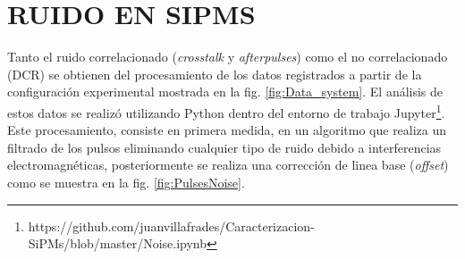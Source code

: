\section{RUIDO EN SIPMS}
Tanto el ruido correlacionado (\textit{crosstalk} y \textit{afterpulses}) como el no correlacionado (DCR) se obtienen del procesamiento de los datos registrados a partir de la configuración experimental mostrada en la fig. \ref{fig:Data_system}. El análisis de estos datos se realizó utilizando Python dentro del entorno de trabajo Jupyter\footnote{https://github.com/juanvillafrades/Caracterizacion-SiPMs/blob/master/Noise.ipynb}. Este procesamiento, consiste en primera medida, en un algoritmo que realiza un filtrado de los pulsos eliminando cualquier tipo de ruido debido a interferencias electromagnéticas, posteriormente se realiza una corrección de linea base (\textit{offset}) como se muestra en la fig. \ref{fig:PulsesNoise}.  
